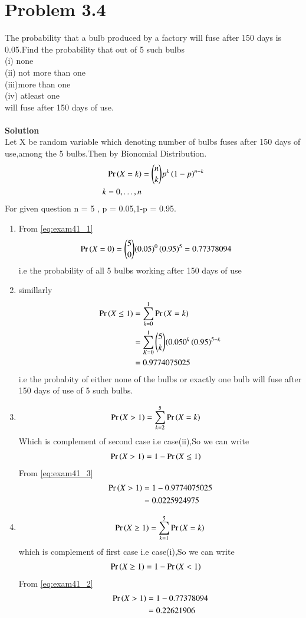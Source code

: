 \documentclass[journal,12pt,twocolumn]{IEEEtran}
\begin{document}
\section{Problem 3.4}
The probability that a bulb produced by a factory will fuse after 150 days is 0.05.Find the probability that out of 5 such bulbs\\ (i) none \\(ii) not more than one\\(iii)more than one\\(iv) atleast one\\ will fuse after 150 days of use.\\\\
\textbf{Solution}\\
Let X be random variable which denoting number of bulbs fuses after 150 days of use,among the 5 bulbs.Then by Bionomial Distribution.
\begin{align}
    \Pr\left(X=k\right)&=\binom{n}{k} p^k\left(1-p\right)^{n-k}
    \\
    k=0,\dots,n
    \label{eq:exam41_1}
\end{align}
For given question n = 5 , p = 0.05,1-p = 0.95.
\begin{enumerate}
\item From \eqref{eq:exam41_1}
\begin{align}
    \Pr\left(X=0\right)&=\binom{5}{0}(0.05)^0\left(0.95\right)^{5}
    =0.77378094 
    \label{eq:exam41_2}
\end{align}
i.e the probability of all 5 bulbs working after 150 days of use
\item simillarly
\begin{align}
    \Pr\left(X\leq1\right)&=\sum_{k=0}^{1}\Pr\left(X=k\right)
    \\
    &=\sum_{K=0}^{1}\binom{5}{k} (0.050^k\left(0.95\right)^{5-k}
    \\
    &=0.9774075025
    \label{eq:exam41_3}
\end{align}
i.e the probabity of either none of the bulbs or exactly one bulb will fuse after 150 days of use of 5 such bulbs.
\item
\begin{align}
    \Pr\left(X>1\right)&=\sum_{k=2}^{5}\Pr\left(X=k\right)
\end{align}
Which is complement of second case i.e case(ii),So we can write 
\begin{align}
    \Pr\left(X>1\right)&= 1-\Pr\left(X\leq1\right)
\end{align}
From \eqref{eq:exam41_3}
\begin{align}
    \Pr\left(X>1\right)&= 1-0.9774075025
    \\
    &=0.0225924975
\end{align}
\item
\begin{align}
    \Pr\left(X\geq1\right)=\sum_{k=1}^{5}\Pr\left(X=k\right)
\end{align}
which is complement of first case i.e case(i),So we can write 
\begin{align}
    \Pr\left(X\geq1\right)&= 1-\Pr\left(X<1\right)
\end{align}
From \eqref{eq:exam41_2}
\begin{align}
    \Pr\left(X>1\right)&= 1-0.77378094
    \\
    &=0.22621906   
\end{align}
\end{enumerate}
\end{document}
